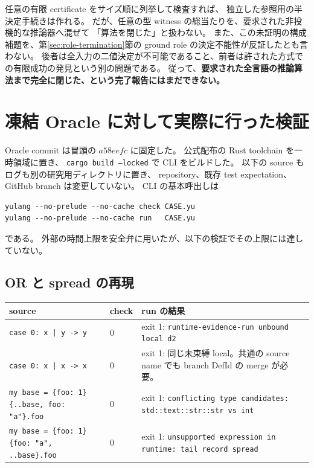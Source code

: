 \documentclass[11pt,a4paper]{article}
\theoremstyle{remark}
\begin{document}
任意の有限 certificate をサイズ順に列挙して検査すれば、
独立した参照用の半決定手続きは作れる。
だが、任意の型 witness の総当たりを、要求された非投機的な推論器へ混ぜて
「算法を閉じた」と扱わない。
また、この未証明の構成補題を、第\ref{sec:role-termination}節の ground role の決定不能性が反証したとも言わない。
後者は全入力の二値決定が不可能であること、前者は許された方式での有限成功の発見という別の問題である。
従って、\textbf{要求された全言語の推論算法まで完全に閉じた、という完了報告にはまだできない。}

\section{凍結 Oracle に対して実際に行った検証}
\label{sec:actual-validation}

Oracle commit は冒頭の \(a58eefc\) に固定した。
公式配布の Rust toolchain を一時領域に置き、
\texttt{cargo build --locked} で CLI をビルドした。
以下の source もログも別の研究用ディレクトリに置き、
repository、既存 test expectation、GitHub branch は変更していない。
CLI の基本呼出しは
\begin{Verbatim}[fontsize=\small]
yulang --no-prelude --no-cache check CASE.yu
yulang --no-prelude --no-cache run   CASE.yu
\end{Verbatim}
である。
外部の時間上限を安全弁に用いたが、以下の検証でその上限には達していない。

\subsection{OR と spread の再現}

\begin{longtable}{p{}p{}p{}}
\toprule
source & check & run の結果 \\
\midrule\endhead
\texttt{case 0: x | y -> y} & 0 & exit 1: \texttt{runtime-evidence-run unbound local d2}\\
\texttt{case 0: x | x -> x} & 0 & exit 1: 同じ未束縛 local。共通の source name でも branch DefId の merge が必要。\\
\texttt{my base = \{foo: 1\}}\newline
\texttt{\{..base, foo: "a"\}.foo} & 0 & exit 1: \texttt{conflicting type candidates: std::text::str::str vs int}\\
\texttt{my base = \{foo: 1\}}\newline
\texttt{\{foo: "a", ..base\}.foo} & 0 & exit 1: \texttt{unsupported expression in runtime: tail record spread}\\
\bottomrule
\end{longtable}
\end{document}
